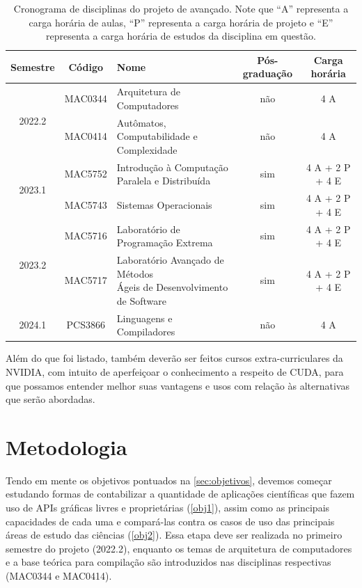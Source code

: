 \documentclass[10pt, a4paper, conference, onecolumn]{IEEEtran}
\begin{document}
\begin{table}[H]
    \centering
    \begin{tabular}{c c l c c} \toprule
        Semestre & Código & Nome & Pós-graduação & Carga horária \\ \midrule
        \multirow{2}{*}{2022.2} & MAC0344 & Arquitetura de Computadores & não & 4 A \\
                                & MAC0414 & Autômatos, Computabilidade e Complexidade & não & 4 A \\ \midrule
        \multirow{2}{*}{2023.1} & MAC5752 & Introdução à Computação Paralela e Distribuída & sim & 4 A + 2 P + 4 E \\
                                & MAC5743 & Sistemas Operacionais & sim & 4 A + 2 P + 4 E \\ \midrule
        \multirow{2}{*}{2023.2} & MAC5716 & Laboratório de Programação Extrema & sim & 4 A + 2 P + 4 E \\
                                & MAC5717 & \makecell[l]{Laboratório Avançado de Métodos \\ Ágeis de Desenvolvimento de Software} & sim & 4 A + 2 P + 4 E \\ \midrule
                         2024.1 & PCS3866 & Linguagens e Compiladores & não & 4 A \\ \bottomrule
    \end{tabular}
    \caption{Cronograma de disciplinas do projeto de avançado. Note que ``A''
    representa a carga horária de aulas, ``P'' representa a carga horária de
    projeto e ``E'' representa a carga horária de estudos da disciplina em
    questão.}
    \label{table:cronograma}
\end{table}

Além do que foi listado, também deverão ser feitos cursos extra-curriculares
da NVIDIA, com intuito de aperfeiçoar o conhecimento a respeito de CUDA, para
que possamos entender melhor suas vantagens e usos com relação às alternativas
que serão abordadas.

\section{Metodologia}

Tendo em mente os objetivos pontuados na \cref{sec:objetivos}, devemos começar
estudando formas de contabilizar a quantidade de aplicações científicas que
fazem uso de APIs gráficas livres e proprietárias (\cref{obj1}), assim como as
principais capacidades de cada uma e compará-las contra os casos de uso das
principais áreas de estudo das ciências (\cref{obj2}).
Essa etapa deve ser realizada no primeiro semestre do projeto (2022.2), enquanto
os temas de arquitetura de computadores e a base teórica para compilação são
introduzidos nas disciplinas respectivas (MAC0344 e MAC0414).
\end{document}
